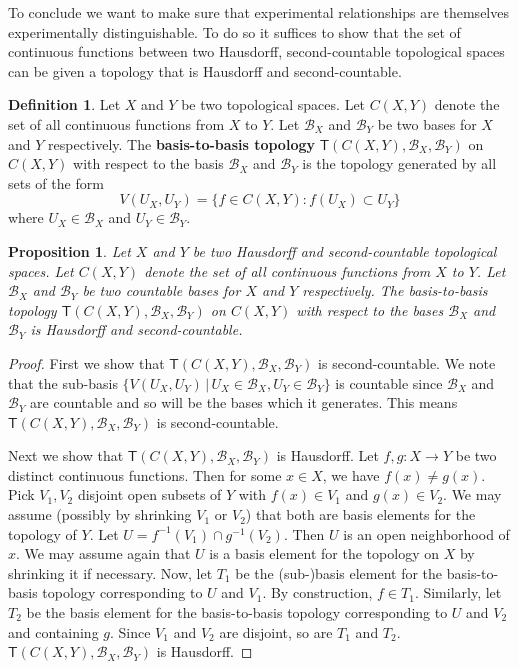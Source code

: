 \documentclass[preprint]{elsarticle}
\theoremstyle{plain}%
\newtheorem{prop}[thm]{Proposition}
\theoremstyle{definition}
\newtheorem{defn}{Definition}[section]
\theoremstyle{remark}
\begin{document}
To conclude we want to make sure that experimental relationships are themselves experimentally distinguishable. To do so it suffices to show that the set of continuous functions between two Hausdorff, second-countable topological spaces can be given a topology that is Hausdorff and second-countable.

\begin{defn} Let $X$ and $Y$ be two topological spaces. Let $C(X,Y)$ denote the set of all continuous functions from $X$ to $Y$. Let $\mathcal{B}_X$ and $\mathcal{B}_Y$ be two bases for $X$ and $Y$ respectively. The \textbf{basis-to-basis topology} $\mathsf{T}(C(X,Y), \mathcal{B}_X, \mathcal{B}_Y)$ on $C(X,Y)$ with respect to the basis $\mathcal{B}_X$ and $\mathcal{B}_Y$ is the topology generated by all sets of the form 
	$$
	V(U_X, U_Y) = \{f\in C(X,Y) : f(U_X)\subset U_Y\}
	$$
where $U_X \in \mathcal{B}_X$ and $U_Y \in \mathcal{B}_Y$.
\end{defn}

\begin{prop}
	Let $X$ and $Y$ be two Hausdorff and second-countable topological spaces. Let $C(X,Y)$ denote the set of all continuous functions from $X$ to $Y$. Let $\mathcal{B}_X$ and $\mathcal{B}_Y$ be two countable bases for $X$ and $Y$ respectively. The basis-to-basis topology $\mathsf{T}(C(X,Y), \mathcal{B}_X, \mathcal{B}_Y)$ on $C(X,Y)$ with respect to the bases $\mathcal{B}_X$ and $\mathcal{B}_Y$ is Hausdorff and second-countable. 
\end{prop}
\begin{proof}
	First we show that $\mathsf{T}(C(X,Y), \mathcal{B}_X, \mathcal{B}_Y)$ is second-countable. We note that the sub-basis $\{V(U_X, U_Y) \, |\,   U_X \in \mathcal{B}_X , U_Y \in \mathcal{B}_Y \}$ is countable since $\mathcal{B}_X$ and $\mathcal{B}_Y$ are countable and so will be the bases which it generates. This means $\mathsf{T}(C(X,Y), \mathcal{B}_X, \mathcal{B}_Y)$ is second-countable.
	
	Next we show that $\mathsf{T}(C(X,Y), \mathcal{B}_X, \mathcal{B}_Y)$ is Hausdorff. Let $f,g:X\to Y$ be two distinct continuous functions. Then for some $x\in X$, we have $f(x)\neq g(x)$. Pick $V_1, V_2$ disjoint open subsets of $Y$ with $f(x)\in V_1$ and $g(x)\in V_2$. We may assume (possibly by shrinking $V_1$ or $V_2$) that both are basis elements for the topology of $Y$. Let $U=f^{-1}(V_1)\cap g^{-1}(V_2)$. Then $U$ is an open neighborhood of $x$. We may assume again that $U$ is a basis element for the topology on $X$ by shrinking it if necessary. Now, let $T_1$ be the (sub-)basis element for the basis-to-basis topology corresponding to $U$ and $V_1$. By construction, $f\in T_1$. Similarly, let $T_2$ be the basis element for the basis-to-basis topology corresponding to $U$ and $V_2$ and containing $g$. Since $V_1$ and $V_2$ are disjoint, so are $T_1$ and $T_2$. $\mathsf{T}(C(X,Y), \mathcal{B}_X, \mathcal{B}_Y)$ is Hausdorff.
\end{proof}
\end{document}
